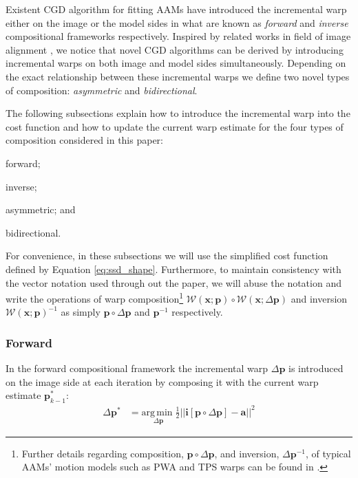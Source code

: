 
Existent CGD algorithm for fitting AAMs have introduced the incremental warp either on the image or the model sides in what are known as \emph{forward} and \emph{inverse} compositional frameworks \cite{Matthews2004, Gross2005, Papandreou2008, Amberg2009, Martins2010, Tzimiropoulos2013} respectively. Inspired by related works in field of image alignment \cite{Malis2004, Megret2008, Autheserre2009, Megret2010}, we notice that novel CGD algorithms can be derived by introducing incremental warps on both image and model sides simultaneously. Depending on the exact relationship between these incremental warps we define two novel types of composition: \emph{asymmetric} and \emph{bidirectional}.

The following subsections explain how to introduce the incremental warp into the cost function and how to update the current warp estimate for the four types of composition considered in this paper: 
\begin{inparaenum}
    \item forward; 
    \item inverse;
    \item asymmetric; and
    \item bidirectional.
\end{inparaenum} For convenience, in these subsections we will use the simplified cost function defined by Equation \ref{eq:ssd_shape}. Furthermore, to maintain consistency with the vector notation used through out the paper, we will abuse the notation and write the operations of warp composition\footnote{\label{foot:warp}Further details regarding composition, $\mathbf{p} \circ \Delta \mathbf{p}$, and inversion, $\Delta \mathbf{p}^{-1}$, of typical AAMs' motion models such as PWA and TPS warps can be found in \cite{Matthews2004, Papandreou2008}.} $\mathcal{W}(\mathbf{x}; \mathbf{p}) \circ \mathcal{W}(\mathbf{x}; \Delta\mathbf{p})$ and inversion $\mathcal{W}(\mathbf{x}; \mathbf{p})^{-1}$ as simply $\mathbf{p} \circ \Delta \mathbf{p}$ and $\mathbf{p}^{-1}$ respectively.

\subsubsection{Forward}
\label{sec:forward}

In the forward compositional framework the incremental warp $\Delta \mathbf{p}$ is introduced on the image side at each iteration by composing it with the current warp estimate $\mathbf{p}_{k-1}^*$:
\begin{equation}
    \begin{aligned}
        \Delta \mathbf{p}^* & = \underset{\Delta \mathbf{p}} {\mathrm{arg\, min\;}} \frac{1}{2}|| \mathbf{i}[\mathbf{p} \circ \Delta \mathbf{p}] - \mathbf{a} ||^2
    \label{eq:ssd_fc}
    \end{aligned}
\end{equation}

